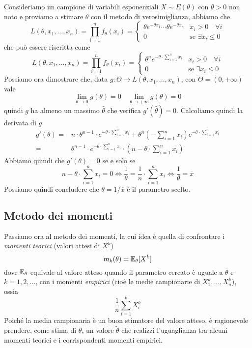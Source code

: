 \begin{example}
	Consideriamo un campione di variabili esponenziali $X \sim E(\theta)$ con $\theta > 0$ non noto
	e proviamo a stimare $\theta$ con il metodo di verosimiglianza, abbiamo che
	\[
		L(\theta, x_1, \dots, x_n) = \prod_{i=1}^n f_\theta(x_i) =
		\begin{cases}
			\theta e^{-\theta x_1} \cdots \theta e^{-\theta x_n} & x_i > 0 \quad \forall i       \\
			0                                                    & \text{se } \exists x_i \leq 0
		\end{cases}
	\]
	che può essere riscritta come
	\[
		L(\theta, x_1, \dots, x_n) =
		\prod_{i=1}^n f_\theta(x_i) =
		\begin{cases}
			\theta^n e^{-\theta \cdot \sum_{i=1}^{n} x_i} & x_i > 0 \quad \forall i       \\
			0                                             & \text{se } \exists x_i \leq 0
		\end{cases}
	\]
	Possiamo ora dimostrare che, data $g : \Theta \to L(\theta, x_1, \dots, x_n)$, con
	$\Theta = (0, +\infty)$ vale
	\[ \lim_{\theta \to 0} g(\theta) = 0 \quad \lim_{\theta \to +\infty} g(\theta) = 0 \]
	quindi $g$ ha almeno un massimo $\hat{\theta}$ che verifica $g'(\hat{\theta}) = 0$. Calcoliamo
	quindi la derivata di $g$
	\begin{align*}
		g'(\theta) = & n \cdot \theta^{n-1} \cdot e^{-\theta \cdot \sum_{i=1}^n x_i} +
		\theta^n \left( -\sum_{i=1}^{n} x_i \right) e^{-\theta \cdot \sum_{i=1}^{n} x_i} \\
		=            & \theta^{n-1} \cdot e^{-\theta \cdot \sum_{i=1}^{n} x_i} \cdot
		\left(n - \theta \cdot \sum_{i=1}^{n} x_i \right)
	\end{align*}
	Abbiamo quindi che $g'(\theta) = 0$ se e solo se
	\[
		n - \theta \cdot \sum_{i=1}^{n} x_i = 0 \iff
		\frac{1}{\theta} = \frac{1}{n} \cdot \sum_{i=1}^{n} x_i \iff
		\frac{1}{\theta} = \overline{x}
	\]
	Possiamo quindi concludere che $\theta = 1 / \overline{x}$ è il parametro scelto.
\end{example}

\subsection{Metodo dei momenti}
Passiamo ora al metodo dei momenti, la cui idea è quella di confrontare i \emph{momenti teorici}
(valori attesi di $X^k$)
\[ m_k(\theta) = \mathbb{E}_\theta [X^k] \]
dove $\mathbb{E}_\theta$ equivale al valore atteso quando il parametro cercato è uguale a $\theta$ e
$k = 1,2,\dots$, con i momenti \emph{empirici} (cioè le medie campionarie di $X_1^k, \dots, X_n^k$),
ossia
\[ \frac{1}{n} \sum_{i=1}^k X_i^k \]
Poiché la media campionaria è un buon stimatore del valore atteso, è ragionevole prendere, come
stima di $\theta$, un valore $\tilde{\theta}$ che realizzi l'uguaglianza tra alcuni momenti teorici
e i corrispondenti momenti empirici.


